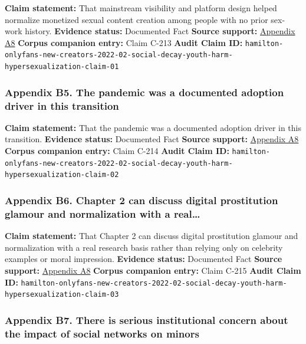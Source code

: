 \documentclass[
  american,
  11pt,
  letterpaper,
]{article}
\begin{document}
\textbf{Claim statement:} That mainstream visibility and platform design
helped normalize monetized sexual content creation among people with no
prior sex-work history. \textbf{Evidence status:} Documented Fact
\textbf{Source support:}
\hyperref[appendix-a8-nudes-shouldn-t-i-charge-for-these-motivations-of-new-sexual-content-creators-on-onlyfans]{Appendix
A8} \textbf{Corpus companion entry:} Claim C-213 \textbf{Audit Claim
ID:}
\texttt{hamilton-onlyfans-new-creators-2022-02-social-decay-youth-harm-hypersexualization-claim-01}

\subsubsection{Appendix B5. The pandemic was a documented adoption
driver in this
transition}\label{appendix-b5-the-pandemic-was-a-documented-adoption-driver-in-this-transition}

\textbf{Claim statement:} That the pandemic was a documented adoption
driver in this transition. \textbf{Evidence status:} Documented Fact
\textbf{Source support:}
\hyperref[appendix-a8-nudes-shouldn-t-i-charge-for-these-motivations-of-new-sexual-content-creators-on-onlyfans]{Appendix
A8} \textbf{Corpus companion entry:} Claim C-214 \textbf{Audit Claim
ID:}
\texttt{hamilton-onlyfans-new-creators-2022-02-social-decay-youth-harm-hypersexualization-claim-02}

\subsubsection{Appendix B6. Chapter 2 can discuss digital prostitution
glamour and normalization with a
real\ldots{}}\label{appendix-b6-chapter-2-can-discuss-digital-prostitution-glamour-and-normalization-with-a-real}

\textbf{Claim statement:} That Chapter 2 can discuss digital
prostitution glamour and normalization with a real research basis rather
than relying only on celebrity examples or moral impression.
\textbf{Evidence status:} Documented Fact \textbf{Source support:}
\hyperref[appendix-a8-nudes-shouldn-t-i-charge-for-these-motivations-of-new-sexual-content-creators-on-onlyfans]{Appendix
A8} \textbf{Corpus companion entry:} Claim C-215 \textbf{Audit Claim
ID:}
\texttt{hamilton-onlyfans-new-creators-2022-02-social-decay-youth-harm-hypersexualization-claim-03}

\subsubsection{Appendix B7. There is serious institutional concern about
the impact of social networks on
minors}\label{appendix-b7-there-is-serious-institutional-concern-about-the-impact-of-social-networks-on-minors}
\end{document}
